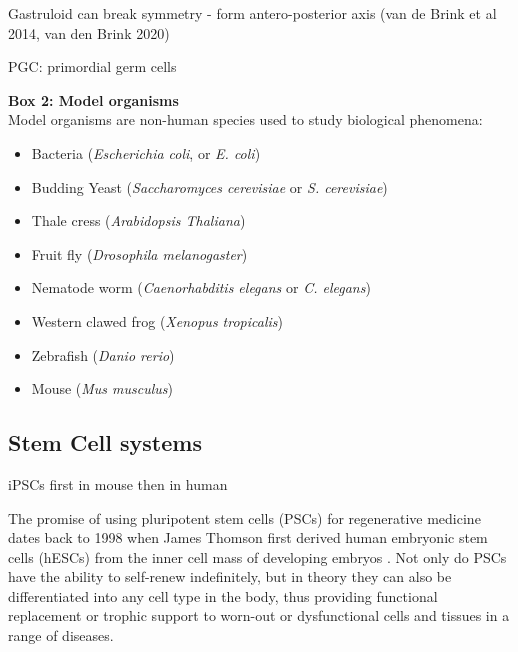 Gastruloid can break symmetry - form antero-posterior axis (van de Brink et al 2014, van den Brink 2020)

PGC: primordial germ cells



\begin{Comment}
\hspace{-2.5mm}\textbf{Box 2: Model organisms}\label{box2}\\

Model organisms are non-human species used to study biological phenomena:

\begin{itemize}
    \item Bacteria (\textit{Escherichia coli}, or \textit{E. coli})
    \item Budding Yeast (\textit{Saccharomyces cerevisiae} or \textit{S. cerevisiae})
    \item Thale cress (\textit{Arabidopsis Thaliana})
    \item Fruit fly (\textit{Drosophila melanogaster})
    \item Nematode worm (\textit{Caenorhabditis elegans} or \textit{C. elegans})
    \item Western clawed frog (\textit{Xenopus tropicalis})
    \item Zebrafish (\textit{Danio rerio})
    \item Mouse (\textit{Mus musculus})

\end{itemize}


\end{Comment}


\subsection{Stem Cell systems}


iPSCs first in mouse \cite{takahashi2006induction}
then in human \cite{takahashi2007induction}


The promise of using pluripotent stem cells (PSCs) for regenerative medicine dates back to 1998 when James Thomson \cite{thomson1998embryonic} first derived human embryonic stem cells (hESCs) from the inner cell mass of developing embryos \cite{kimbrel2015current}.
Not only do PSCs have the ability to self-renew indefinitely, but in theory they can also be differentiated into any cell type in the body, thus providing functional replacement or trophic support to worn-out or dysfunctional cells and tissues in a range of diseases. \\

